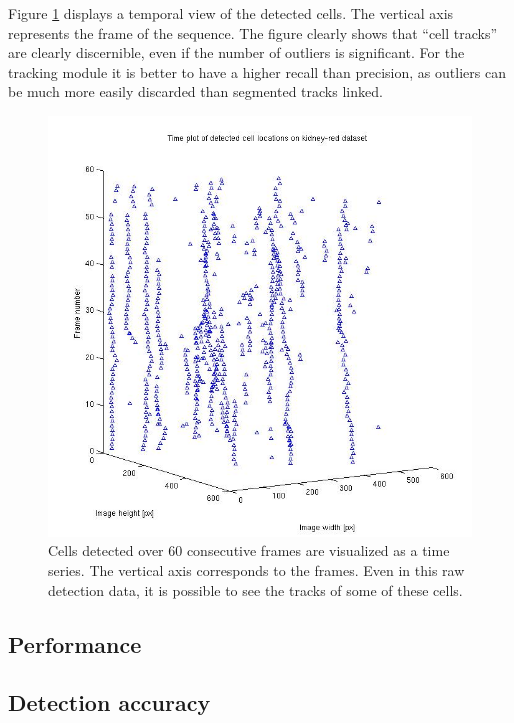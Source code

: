 	
		Figure \ref{fig:cell_tracks_detection} displays a temporal view of the detected cells. The vertical axis represents the frame of the sequence. The figure clearly shows that ``cell tracks'' are clearly discernible, even if the number of outliers is significant. For the tracking module it is better to have a higher recall than precision, as outliers can be much more easily discarded than segmented tracks linked.
		\begin{figure}
			  \includegraphics[width=\textwidth]{images/cell_tracks}
			\caption{Cells detected over 60 consecutive frames are visualized as a time series. The vertical axis corresponds to the frames. Even in this raw detection data, it is possible to see the tracks of some of these cells.}
		    \label{fig:cell_tracks_detection}
		\end{figure}
		
			\subsection{Performance }
		
		\subsection{Detection accuracy }

